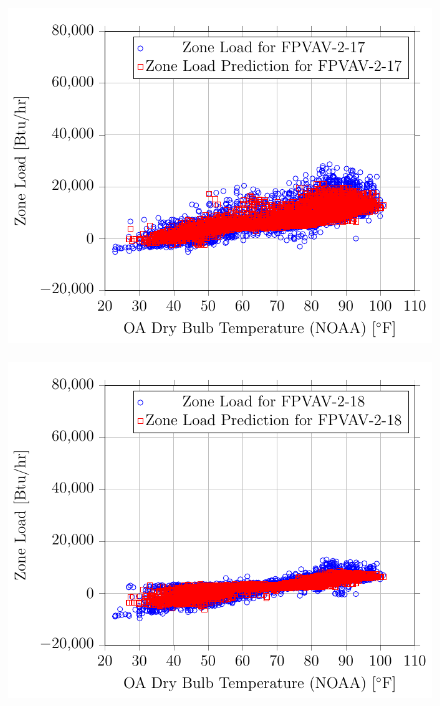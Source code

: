 \begin{figure}
    \centering
    \includegraphics{Plots/13/2017-06-27-1141-BtuhrvsOADryBulbTemperatureNOAAF.pdf}
    \caption{}
    \label{fig:2017-06-27-1141-BtuhrvsOADryBulbTemperatureNOAAF}
\end{figure}

\begin{figure}
\centering
\includegraphics{Plots/14/2017-06-27-1145-BtuhrvsOADryBulbTemperatureNOAAF.pdf}
\caption{}
\label{fig:2017-06-27-1145-BtuhrvsOADryBulbTemperatureNOAAF}
\end{figure}

